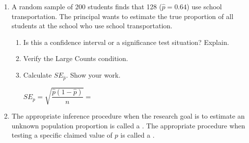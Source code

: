 \documentclass[10pt]{article}
\begin{document}
\namedateperiod

\vspace{0.15in}

\begin{enumerate}
  \item A random sample of 200 students finds that 128 ($\hat p = 0.64$) use school
        transportation. The principal wants to estimate the true proportion of all
        students at the school who use school transportation.

        \begin{enumerate}[label=\alph*.]
          \item Is this a confidence interval or a significance test situation? Explain.
          \item Verify the Large Counts condition. 
          \item Calculate $SE_{\hat p}$. Show your work.

                $SE_{\hat p} = \sqrt{\dfrac{\hat p(1-\hat p)}{n}} = $ \blank{7cm}
        \end{enumerate}

  \item The appropriate inference procedure when the research goal is to estimate an
        unknown population proportion is called a \blank{8cm}.
        The appropriate procedure when testing a specific claimed value of $p$ is
        called a \blank{8cm}.
\end{enumerate}
\end{document}
